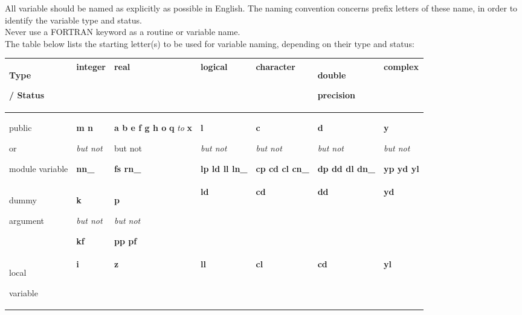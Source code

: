\documentclass{article}
\begin{document}
All variable should be named as explicitly as possible in English.
The naming convention concerns prefix letters of these name, in order to identify the variable type and status. \\
Never use a FORTRAN keyword as a routine or variable name. \\
The table below lists the starting letter(s) to be used for variable naming, depending on their type and status:
\begin{table}[htbp]
  \begin{center}
    \begin{tabular}{|p{50pt}|p{50pt}|p{50pt}|p{50pt}|p{50pt}|p{50pt}|p{50pt}|}
      \hline
      Type \par / Status &   integer&   real&   logical &   character&   double \par precision&   complex \\
      \hline
      public  \par or  \par module variable& \textbf{m n} \par \textit{but not } \par \textbf{nn\_}& \textbf{a b e f g h o} \textbf{q} \textit{to} \textbf{x} \par but not \par \textbf{fs rn\_}& \textbf{l} \par \textit{but not} \par \textbf{lp ld ll ln\_}& \textbf{c} \par \textit{but not} \par \textbf{cp cd cl cn\_}& \textbf{d} \par \textit{but not} \par \textbf{dp dd dl dn\_}& \textbf{y} \par \textit{but not} \par \textbf{yp yd yl} \\
      \hline
      dummy \par argument& \textbf{k} \par \textit{but not} \par \textbf{kf}& \textbf{p} \par \textit{but not}  \par \textbf{pp pf}& \textbf{ld}& \textbf{cd}& \textbf{dd}& \textbf{yd} \\
      \hline
      local \par variable& \textbf{i}& \textbf{z}& \textbf{ll}& \textbf{cl}& \textbf{cd}& \textbf{yl} \\

\end{tabular}
\end{center}
\end{table}
\end{document}
